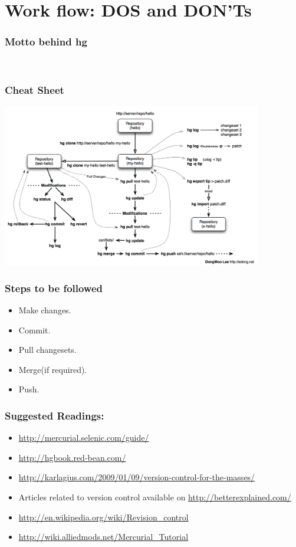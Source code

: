 \documentclass[14pt,compress]{beamer}
\newcounter{time}
\newcommand{\inctime}[1]{\addtocounter{time}{#1}{\tiny \thetime\ m}}
\begin{document}
\section{Work flow: DOS and DON'Ts}

\begin{frame}
  \frametitle{Motto behind hg}
  \begin{center}
  \color{red}{``Commit Early Commit Often.''}\\  
  \end{center}  
\end{frame}

\begin{frame}
  \frametitle{Cheat Sheet}
  \begin{center}
  \includegraphics[height=2.8in]{mod}  
  \end{center}  
\end{frame}

\begin{frame}
  \frametitle{Steps to be followed}
  \begin{itemize}
  \item Make changes.
  \item Commit.
  \item Pull changesets.
  \item Merge(if required).
  \item Push.
  \end{itemize}
  \inctime{10}
\end{frame}

\begin{frame}
  \frametitle{Suggested Readings:}
  \begin{itemize}
  \item \url{http://mercurial.selenic.com/guide/}
  \item \url{http://hgbook.red-bean.com/}    
  \item \url{http://karlagius.com/2009/01/09/version-control-for-the-masses/}
  \item Articles related to version control available on \url{http://betterexplained.com/}
  \item \url{http://en.wikipedia.org/wiki/Revision_control}
  \item \url{http://wiki.alliedmods.net/Mercurial_Tutorial}
  \end{itemize}
\end{frame}
\end{document}
